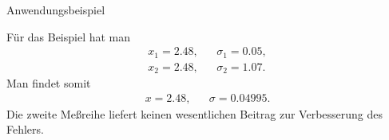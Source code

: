 \documentclass[german]{beamer}
\newcommand{\bq}{\begin{eqnarray*}}
\newcommand{\eq}{\end{eqnarray*}}
\begin{document}
\begin{frame}{Anwendungsbeispiel}

F\"ur das Beispiel hat man
\bq
 x_1 = 2.48, & & \sigma_1 = 0.05,
 \nonumber \\
 x_2 = 2.48, & & \sigma_2 = 1.07.
\eq
Man findet somit
\bq
 x = 2.48, & & \sigma = 0.04995.
\eq
Die zweite Me{\ss}reihe liefert keinen wesentlichen Beitrag zur Verbesserung des Fehlers.

\end{frame}


\begin{frame}

\end{frame}
\end{document}
